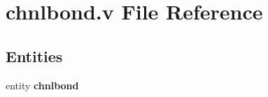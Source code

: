 \section{chnlbond.\-v File Reference}
\label{chnlbond_8v}
\subsection*{Entities}
\begin{DoxyCompactItemize}
\item 
entity {\bf chnlbond}
\end{DoxyCompactItemize}
